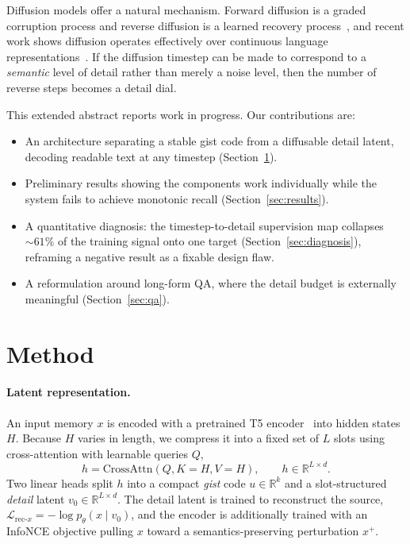 \documentclass{article}
\begin{document}
Diffusion models offer a natural mechanism. Forward diffusion is a graded corruption process and reverse diffusion is a learned recovery process~\citep{ho2020,nichol2021}, and recent work shows diffusion operates effectively over continuous language representations~\citep{li2022,lovelace2023}. If the diffusion timestep can be made to correspond to a \emph{semantic} level of detail rather than merely a noise level, then the number of reverse steps becomes a detail dial.

This extended abstract reports work in progress. Our contributions are:
\begin{itemize}\setlength{\itemsep}{0pt}
  \item An architecture separating a stable gist code from a diffusable detail latent, decoding readable text at any timestep (Section~\ref{sec:method}).
  \item Preliminary results showing the components work individually while the system fails to achieve monotonic recall (Section~\ref{sec:results}).
  \item A quantitative diagnosis: the timestep-to-detail supervision map collapses ${\sim}61\%$ of the training signal onto one target (Section~\ref{sec:diagnosis}), reframing a negative result as a fixable design flaw.
  \item A reformulation around long-form QA, where the detail budget is externally meaningful (Section~\ref{sec:qa}).
\end{itemize}

\section{Method}
\label{sec:method}

\paragraph{Latent representation.}
An input memory $x$ is encoded with a pretrained T5 encoder~\citep{raffel2020} into hidden states $H$. Because $H$ varies in length, we compress it into a fixed set of $L$ slots using cross-attention with learnable queries $Q$,
\begin{equation}
h = \mathrm{CrossAttn}(Q, K{=}H, V{=}H), \qquad h \in \mathbb{R}^{L \times d}.
\end{equation}
Two linear heads split $h$ into a compact \emph{gist} code $u \in \mathbb{R}^{k}$ and a slot-structured \emph{detail} latent $v_0 \in \mathbb{R}^{L \times d}$. The detail latent is trained to reconstruct the source, $\mathcal{L}_{\text{rec-}x} = -\log p_\theta(x \mid v_0)$, and the encoder is additionally trained with an InfoNCE objective pulling $x$ toward a semantics-preserving perturbation $x^{+}$.
\end{document}
